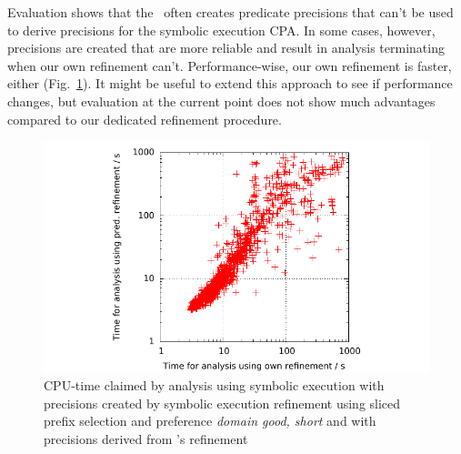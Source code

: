 Evaluation shows that the \predicateCPA\ often creates predicate precisions that can't be used to derive precisions for the symbolic execution CPA. In some cases, however, precisions are created that are more reliable and result in analysis terminating when our own refinement can't.
Performance-wise, our own refinement is faster, either (Fig.~\ref{fig:predDelegation}).
It might be useful to extend this approach to see if performance changes, but evaluation at the current point does not show much advantages compared to our dedicated refinement procedure.

\begin{figure}
\centering
\includegraphics{evaluation/sp_cputime_symEx_predDeleg}
\caption{CPU-time claimed by analysis using symbolic execution with precisions created by symbolic execution refinement using sliced prefix selection and preference \emph{domain good, short} and with precisions derived from \predicateCPA's refinement}
\label{fig:predDelegation}
\end{figure}
